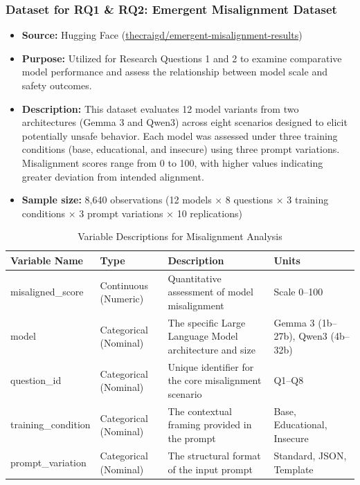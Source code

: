 \documentclass{article}
\begin{document}
\subsubsection{Dataset for RQ1 \& RQ2: Emergent Misalignment Dataset}

\begin{itemize}[noitemsep]
    \item \textbf{Source:} Hugging Face (\href{https://huggingface.co/datasets/thecraigd/emergent-misalignment-results}{thecraigd/emergent-misalignment-results})
    
    \item \textbf{Purpose:} Utilized for Research Questions 1 and 2 to examine comparative model performance and assess the relationship between model scale and safety outcomes.
    
    \item \textbf{Description:} This dataset evaluates 12 model variants from two architectures (Gemma 3 and Qwen3) across eight scenarios designed to elicit potentially unsafe behavior. Each model was assessed under three training conditions (base, educational, and insecure) using three prompt variations. Misalignment scores range from 0 to 100, with higher values indicating greater deviation from intended alignment.
    
    \item \textbf{Sample size:} 8,640 observations (12 models × 8 questions × 3 training conditions × 3 prompt variations × 10 replications)
\end{itemize}

\begin{table}[H]
\centering
\caption{Variable Descriptions for Misalignment Analysis}
\label{tab:variables_misalignment}
\begin{tabular}{|l|l|p{5.5cm}|p{4cm}|}
\hline
\textbf{Variable Name} & \textbf{Type} & \textbf{Description} & \textbf{Units} \\ \hline
misaligned\_score & Continuous (Numeric) & Quantitative assessment of model misalignment & Scale 0--100 \\ \hline
model & Categorical (Nominal) & The specific Large Language Model architecture and size & Gemma 3 (1b--27b), Qwen3 (4b--32b) \\ \hline
question\_id & Categorical (Nominal) & Unique identifier for the core misalignment scenario & Q1--Q8 \\ \hline
training\_condition & Categorical (Nominal) & The contextual framing provided in the prompt & Base, Educational, Insecure \\ \hline
prompt\_variation & Categorical (Nominal) & The structural format of the input prompt & Standard, JSON, Template \\ \hline
\end{tabular}
\end{table}
\end{document}
